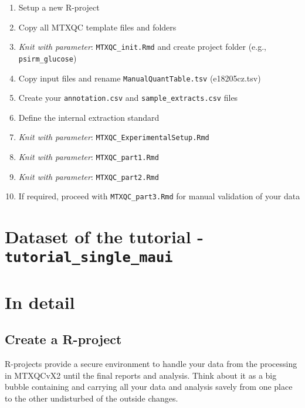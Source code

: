 \documentclass[]{book}
\providecommand{\tightlist}{%
  \setlength{\itemsep}{0pt}\setlength{\parskip}{0pt}}
\begin{document}
\begin{enumerate}
\def\labelenumi{\arabic{enumi}.}
\tightlist
\item
  Setup a new R-project
\item
  Copy all MTXQC template files and folders
\item
  \emph{Knit with parameter}: \texttt{MTXQC\_init.Rmd} and create project folder (e.g., \texttt{psirm\_glucose})
\item
  Copy input files and rename \texttt{ManualQuantTable.tsv} (e18205cz.tsv)
\item
  Create your \texttt{annotation.csv} and \texttt{sample\_extracts.csv} files
\item
  Define the internal extraction standard
\item
  \emph{Knit with parameter}: \texttt{MTXQC\_ExperimentalSetup.Rmd}
\item
  \emph{Knit with parameter}: \texttt{MTXQC\_part1.Rmd}
\item
  \emph{Knit with parameter}: \texttt{MTXQC\_part2.Rmd}
\item
  If required, proceed with \texttt{MTXQC\_part3.Rmd} for manual validation of your data
\end{enumerate}

\hypertarget{dataset-of-the-tutorial---tutorial_single_maui}{%
\section{\texorpdfstring{Dataset of the tutorial - \texttt{tutorial\_single\_maui}}{Dataset of the tutorial - tutorial\_single\_maui}}\label{dataset-of-the-tutorial---tutorial_single_maui}}

\hypertarget{indetail-maui}{%
\section{In detail}\label{indetail-maui}}

\hypertarget{create-a-r-project}{%
\subsection{Create a R-project}\label{create-a-r-project}}

R-projects provide a secure environment to handle your data from the processing in MTXQCvX2 until the final reports and analysis. Think about it as a big bubble containing and carrying all your data and analysis savely from one place to the other undisturbed of the outside changes.
\end{document}
